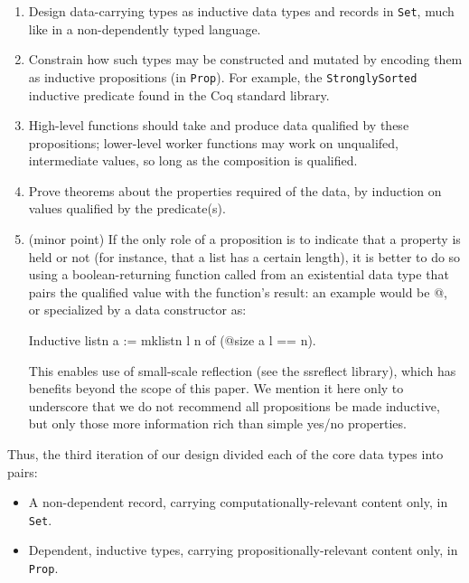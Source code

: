 \documentclass{llncs}
\begin{document}
\begin{enumerate}
\item Design data-carrying types as inductive data types and records in
  \texttt{Set}, much like in a non-dependently typed language.

\item Constrain how such types may be constructed and mutated by encoding them
  as inductive propositions (in \texttt{Prop}).  For example, the
  \texttt{StronglySorted} inductive predicate found in the Coq standard
  library.

\item High-level functions should take and produce data qualified by these
  propositions; lower-level worker functions may work on unqualifed,
  intermediate values, so long as the composition is qualified.

\item Prove theorems about the properties required of the data, by induction
  on values qualified by the predicate(s).

\item (minor point) If the only role of a proposition is to indicate
  that a property is held or not (for instance, that a list has a
  certain length), it is better to do so using a boolean-returning
  function called from an existential data type that pairs the
  qualified value with the function's result: an example would be
  @, or specialized by a data
  constructor as:

\begin{coq_example*}
Inductive listn {a} := mklistn l n of (@size a l == n).
\end{coq_example*}
  
  This enables use of small-scale reflection (see the \textsf{ssreflect}
  library), which has benefits beyond the scope of this paper.  We mention it
  here only to underscore that we do not recommend all propositions be made
  inductive, but only those more information rich than simple yes/no properties.

\end{enumerate}

Thus, the third iteration of our design divided each of the core data types
into pairs:

\begin{itemize}
\item A non-dependent record, carrying computationally-relevant content only,
  in \texttt{Set}.

\item Dependent, inductive types, carrying propositionally-relevant content
  only, in \texttt{Prop}.
\end{itemize}
\end{document}
